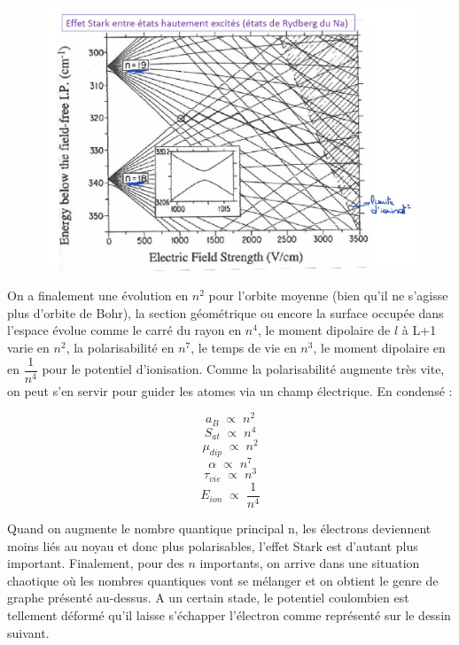 \begin{figure}[tph]
    \centering
    \includegraphics[scale=0.7]{Images2/GrapheStark.PNG}
\end{figure}

On a finalement une évolution en $n^2$ pour l'orbite moyenne (bien qu'il ne s'agisse plus d'orbite de Bohr), la section géométrique ou encore la surface occupée dans l'espace évolue comme le carré du rayon en $n^4$, le moment dipolaire de $l$ à L+1 varie en $n^2$, la polarisabilité en $n^7$, le temps de vie en $n^3$, le moment dipolaire en en $\dfrac{1}{n^4}$ pour le potentiel d'ionisation. Comme la polarisabilité augmente très vite, on peut s'en servir pour guider les atomes via un champ électrique. En condensé :

\[
    a_B \; \propto\; n^2
\]
\[
    S_{at} \; \propto\; n^4
\]
\[
    \mu_{dip} \; \propto\; n^2
\]
\[
    \alpha \; \propto\; n^7
\]
\[
    \tau_{vie} \; \propto\; n^3
\]
\[
    E_{ion} \; \propto\; \dfrac{1}{n^4}
\]

Quand on augmente le nombre quantique principal n, les électrons deviennent moins liés au noyau et donc plus polarisables, l'effet Stark est d'autant plus important. Finalement, pour des $n$ importants, on arrive dans une situation chaotique où les nombres quantiques vont se mélanger et on obtient le genre de graphe présenté au-dessus. A un certain stade, le potentiel coulombien est tellement déformé qu'il laisse s'échapper l'électron comme représenté sur le dessin suivant.\\

